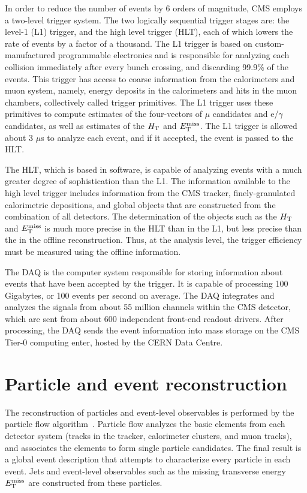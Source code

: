 In order to reduce the number of events by 6 orders of magnitude, CMS employs a two-level trigger system. The two logically sequential trigger stages are: the level-1 (L1) trigger, and the high level trigger (HLT), each of which lowers the rate of events by a factor of a thousand. The L1 trigger is based on custom-manufactured programmable electronics and is responsible for analyzing each collision immediately after every bunch crossing, and discarding 99.9\% of the events. This trigger has access to coarse information from the calorimeters and muon system, namely, energy deposits in the calorimeters and hits in the muon chambers, collectively called trigger primitives. The L1 trigger uses these primitives to compute estimates of the four-vectors of $\mu$ candidates and e/$\gamma$ candidates, as well as estimates of the $H_{\rm T}$ and $E_{\text{T}}^{\rm miss}$. The L1 trigger is allowed about 3 $\mu$s to analyze each event, and if it accepted, the event is passed to the HLT. 

The HLT, which is based in software, is capable of analyzing events with a much greater degree of sophistication than the L1. The information available to the high level trigger includes information from the CMS tracker, finely-granulated calorimetric depositions, and global objects that are constructed from the combination of all detectors.  The determination of the objects such as the $H_{\rm T}$ and $E_{\text{T}}^{\rm miss}$ is much more precise in the HLT than in the L1, but less precise than the in the offline reconstruction.  Thus, at the analysis level, the trigger efficiency must be measured using the offline information.

The DAQ is the computer system responsible for storing information about events that have been accepted by the trigger. It is capable of processing 100 Gigabytes, or 100 events per second on average. The DAQ  integrates and analyzes the signals from about 55 million channels within the CMS detector, which are sent from about 600 independent front-end readout drivers. After processing, the DAQ sends the event information into mass storage on the CMS Tier-0 computing  enter, hosted by the CERN Data Centre.

\section{Particle and event reconstruction}
The reconstruction of particles and event-level observables is performed by the particle flow algorithm~\cite{Beaudette:2014cea}. Particle flow analyzes the basic elements from each detector system (tracks in the tracker, calorimeter clusters, and muon tracks), and associates the elements to form single particle candidates. The final result is a global event description that attempts to characterize every particle in each event. Jets and event-level observables such as the missing transverse energy $E_{\text{T}}^{\rm miss}$ are constructed from these particles. 

